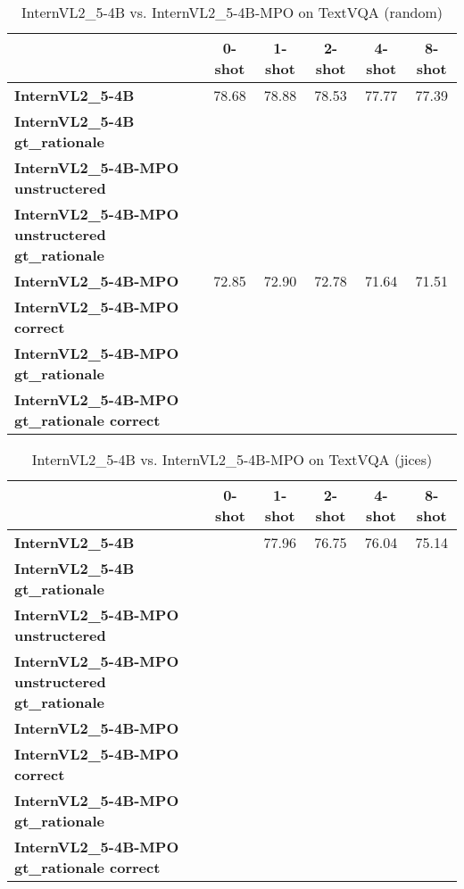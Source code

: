 \begin{table}
\caption{InternVL2\_5-4B vs. InternVL2\_5-4B-MPO on TextVQA (random)}
\label{tab:InternVL2_5-4B_TextVQA_TRAIN_random}
\begin{tabular}{lccccc}
\toprule
 & 0-shot & 1-shot & 2-shot & 4-shot & 8-shot \\
\midrule
\textbf{InternVL2\_5-4B} & 78.68 & 78.88 & 78.53 & 77.77 & 77.39 \\
\textbf{InternVL2\_5-4B gt\_rationale} &  &  &  &  &  \\
\textbf{InternVL2\_5-4B-MPO unstructered} &  &  &  &  &  \\
\textbf{InternVL2\_5-4B-MPO unstructered gt\_rationale} &  &  &  &  &  \\
\textbf{InternVL2\_5-4B-MPO} & 72.85 & 72.90 & 72.78 & 71.64 & 71.51 \\
\textbf{InternVL2\_5-4B-MPO correct} &  &  &  &  &  \\
\textbf{InternVL2\_5-4B-MPO gt\_rationale} &  &  &  &  &  \\
\textbf{InternVL2\_5-4B-MPO gt\_rationale correct} &  &  &  &  &  \\
\bottomrule
\end{tabular}
\end{table}


\begin{table}
\caption{InternVL2\_5-4B vs. InternVL2\_5-4B-MPO on TextVQA (jices)}
\label{tab:InternVL2_5-4B_TextVQA_TRAIN_jices}
\begin{tabular}{lccccc}
\toprule
 & 0-shot & 1-shot & 2-shot & 4-shot & 8-shot \\
\midrule
\textbf{InternVL2\_5-4B} &  & 77.96 & 76.75 & 76.04 & 75.14 \\
\textbf{InternVL2\_5-4B gt\_rationale} &  &  &  &  &  \\
\textbf{InternVL2\_5-4B-MPO unstructered} &  &  &  &  &  \\
\textbf{InternVL2\_5-4B-MPO unstructered gt\_rationale} &  &  &  &  &  \\
\textbf{InternVL2\_5-4B-MPO} &  &  &  &  &  \\
\textbf{InternVL2\_5-4B-MPO correct} &  &  &  &  &  \\
\textbf{InternVL2\_5-4B-MPO gt\_rationale} &  &  &  &  &  \\
\textbf{InternVL2\_5-4B-MPO gt\_rationale correct} &  &  &  &  &  \\
\bottomrule
\end{tabular}
\end{table}


